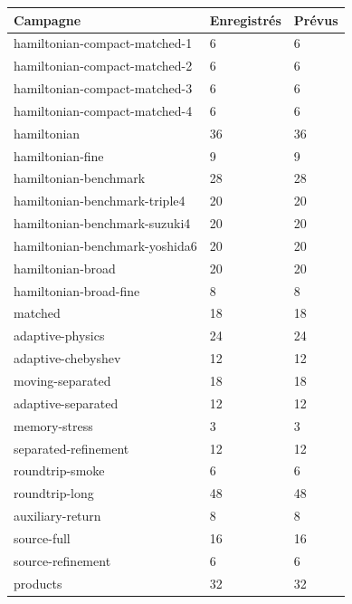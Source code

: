 \documentclass[10pt,a4paper]{article}
\begin{document}
\begin{center}\small\begin{tabular}{lll}\toprule
Campagne & Enregistrés & Prévus\\\midrule
hamiltonian-compact-matched-1 & 6 & 6\\
hamiltonian-compact-matched-2 & 6 & 6\\
hamiltonian-compact-matched-3 & 6 & 6\\
hamiltonian-compact-matched-4 & 6 & 6\\
hamiltonian & 36 & 36\\
hamiltonian-fine & 9 & 9\\
hamiltonian-benchmark & 28 & 28\\
hamiltonian-benchmark-triple4 & 20 & 20\\
hamiltonian-benchmark-suzuki4 & 20 & 20\\
hamiltonian-benchmark-yoshida6 & 20 & 20\\
hamiltonian-broad & 20 & 20\\
hamiltonian-broad-fine & 8 & 8\\
matched & 18 & 18\\
adaptive-physics & 24 & 24\\
adaptive-chebyshev & 12 & 12\\
moving-separated & 18 & 18\\
adaptive-separated & 12 & 12\\
memory-stress & 3 & 3\\
separated-refinement & 12 & 12\\
roundtrip-smoke & 6 & 6\\
roundtrip-long & 48 & 48\\
auxiliary-return & 8 & 8\\
source-full & 16 & 16\\
source-refinement & 6 & 6\\
products & 32 & 32\\
\bottomrule\end{tabular}\end{center}
\end{document}

